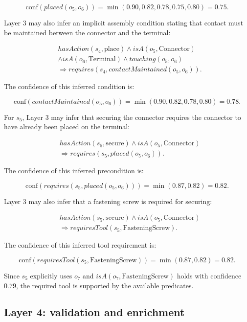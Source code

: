 \[
\text{conf}(placed(o_5,o_6)) =
\min(0.90,0.82,0.78,0.75,0.80) = 0.75.
\]

Layer 3 may also infer an implicit assembly condition stating that contact must be maintained between the connector and the terminal:

\[
\begin{aligned}
&hasAction(s_4,\text{place}) \wedge isA(o_5,\text{Connector}) \\
&\wedge isA(o_6,\text{Terminal}) \wedge touching(o_5,o_6) \\
&\Rightarrow requires(s_4, contactMaintained(o_5,o_6)).
\end{aligned}
\]


The confidence of this inferred condition is:

\[
\text{conf}(contactMaintained(o_5,o_6)) =
\min(0.90,0.82,0.78,0.80) = 0.78.
\]

For $s_5$, Layer 3 may infer that securing the connector requires the connector to have already been placed on the terminal:

\[
\begin{aligned}
&hasAction(s_5,\text{secure}) \wedge isA(o_5,\text{Connector}) \\
&\Rightarrow requires(s_5, placed(o_5,o_6)).
\end{aligned}
\]


The confidence of this inferred precondition is:

\[
\text{conf}(requires(s_5, placed(o_5,o_6))) =
\min(0.87,0.82) = 0.82.
\]

Layer 3 may also infer that a fastening screw is required for securing:

\[
\begin{aligned}
&hasAction(s_5,\text{secure}) \wedge isA(o_5,\text{Connector}) \\
&\Rightarrow requiresTool(s_5,\text{FasteningScrew}).
\end{aligned}
\]



The confidence of this inferred tool requirement is:

\[
\text{conf}(requiresTool(s_5,\text{FasteningScrew})) =
\min(0.87,0.82) = 0.82.
\]

Since $s_5$ explicitly uses $o_7$ and $isA(o_7,\text{FasteningScrew})$ holds with confidence $0.79$, the required tool is supported by the available predicates.

\subsection{Layer 4: validation and enrichment}

